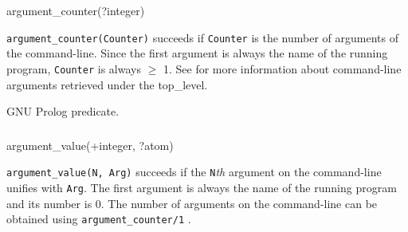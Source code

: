 \begin{TemplatesOneCol}
argument\_counter(?integer)

\end{TemplatesOneCol}

\Description

\texttt{argument\_counter(Counter)} succeeds if \texttt{Counter} is the
number of arguments of the command-line. Since the first argument is always
the name of the running program, \texttt{Counter} is always $\geq$ 1. See
 for more information about
command-line arguments retrieved under the top\_level.


\begin{PlErrors}


\end{PlErrors}

\Portability

GNU Prolog predicate.

\subsubsection{\label{argument-value/2}}

\begin{TemplatesOneCol}
argument\_value(+integer, ?atom)

\end{TemplatesOneCol}

\Description

\texttt{argument\_value(N, Arg)} succeeds if the \texttt{N}\emph{th}
argument on the command-line unifies with \texttt{Arg}. The first argument
is always the name of the running program and its number is 0. The number of
arguments on the command-line can be obtained using
\texttt{argument\_counter/1} .

\begin{PlErrors}





\end{PlErrors}

